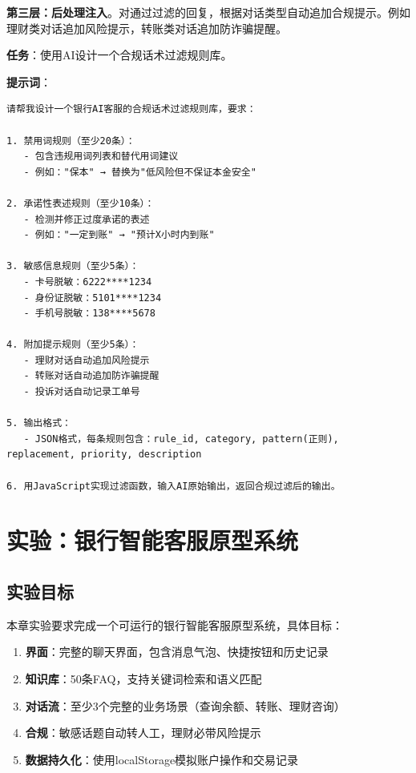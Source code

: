 \textbf{第三层：后处理注入}。对通过过滤的回复，根据对话类型自动追加合规提示。例如理财类对话追加风险提示，转账类对话追加防诈骗提醒。

\begin{practicebox}[设计合规话术过滤规则]
\textbf{任务}：使用AI设计一个合规话术过滤规则库。

\textbf{提示词}：

\begin{lstlisting}
请帮我设计一个银行AI客服的合规话术过滤规则库，要求：

1. 禁用词规则（至少20条）：
   - 包含违规用词列表和替代用词建议
   - 例如："保本" → 替换为"低风险但不保证本金安全"

2. 承诺性表述规则（至少10条）：
   - 检测并修正过度承诺的表述
   - 例如："一定到账" → "预计X小时内到账"

3. 敏感信息规则（至少5条）：
   - 卡号脱敏：6222****1234
   - 身份证脱敏：5101****1234
   - 手机号脱敏：138****5678

4. 附加提示规则（至少5条）：
   - 理财对话自动追加风险提示
   - 转账对话自动追加防诈骗提醒
   - 投诉对话自动记录工单号

5. 输出格式：
   - JSON格式，每条规则包含：rule_id, category, pattern(正则), replacement, priority, description

6. 用JavaScript实现过滤函数，输入AI原始输出，返回合规过滤后的输出。
\end{lstlisting}
\end{practicebox}

\section{实验：银行智能客服原型系统}

\subsection{实验目标}

本章实验要求完成一个可运行的银行智能客服原型系统，具体目标：

\begin{enumerate}[leftmargin=2em]
  \item \textbf{界面}：完整的聊天界面，包含消息气泡、快捷按钮和历史记录
  \item \textbf{知识库}：50条FAQ，支持关键词检索和语义匹配
  \item \textbf{对话流}：至少3个完整的业务场景（查询余额、转账、理财咨询）
  \item \textbf{合规}：敏感话题自动转人工，理财必带风险提示
  \item \textbf{数据持久化}：使用localStorage模拟账户操作和交易记录
\end{enumerate}

